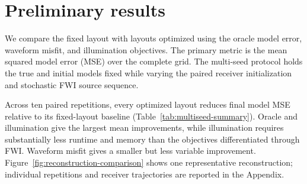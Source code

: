 \section{Preliminary results}

We compare the fixed layout with layouts optimized using the oracle model
error, waveform misfit, and illumination objectives. The primary metric is the mean squared model error (MSE) over the complete grid. The multi-seed protocol holds the true and initial models fixed while varying the paired receiver initialization and stochastic FWI source sequence.


Across ten paired repetitions, every optimized layout reduces final model MSE
relative to its fixed-layout baseline (Table~\ref{tab:multiseed-summary}).
Oracle and illumination give the largest mean improvements, while illumination
requires substantially less runtime and memory than the objectives
differentiated through FWI. Waveform misfit gives a smaller
but less variable improvement. Figure~\ref{fig:reconstruction-comparison} shows
one representative reconstruction; individual repetitions and receiver
trajectories are reported in the Appendix.


